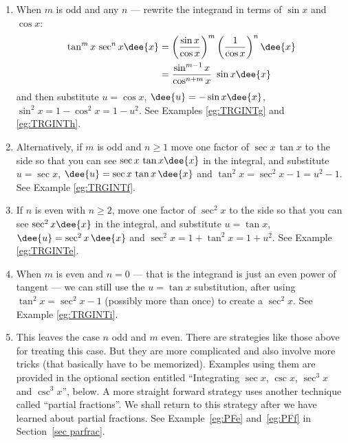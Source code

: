 \begin{enumerate}[(1)]
 \item When $m$ is odd and any $n$ --- rewrite the integrand in terms of $\sin
x$ and $\cos x$:
\begin{align*}
\tan^m x\,\sec^n x\dee{x}
       &=\left(\frac{\sin x}{\cos x}\right)^m 
         \left(\frac{1}{\cos x}\right)^n\dee{x}\\
       &=\frac{\sin^{m-1}x}{\cos^{n+m}x}\ \sin x\dee{x}
\end{align*}
and then substitute $u=\cos x$, $\dee{u} = -\sin x\dee{x}$, $\sin^2x = 1-\cos^2x=1-u^2$. See
Examples \ref{eg:TRGINTg} and \ref{eg:TRGINTh}.
 \item Alternatively, if $m$ is odd and $n \geq 1$ move one factor of
$\sec x\,\tan x$ to the side so that you can see $\sec x\,\tan x\dee{x}$
in the integral, and substitute $u=\sec x$, $\dee{u}=\sec x\,\tan x\,\dee{x}$
and $\tan^2 x = \sec^2 x-1=u^2-1$. See Example \ref{eg:TRGINTf}.

\item
If $n$ is even with $n\ge 2$, move one factor of $\sec^2 x$ to
the side so that you can see $\sec^2 x\dee{x}$ in the integral, and
substitute $u=\tan x$, $\dee{u}=\sec^2 x\,\dee{x}$ and $\sec^2 x = 1+\tan^2 x=1+u^2$.
See Example \ref{eg:TRGINTe}.

\item When $m$ is even and $n=0$ --- that is the integrand is just an even power of
tangent --- we can still use the $u=\tan x$ substitution,
after using $\tan^2x = \sec^2 x - 1$ (possibly more than once) to
create a $\sec^2 x$. See Example \ref{eg:TRGINTi}.

\item This leaves the case $n$ odd and $m$ even.
There are strategies like those above for treating this case. But
they are more complicated and also involve more tricks (that basically
have to be memorized). Examples using
them are provided in the optional section entitled
``Integrating $\sec x$, $\csc x$, $\sec^3 x$ and $\csc^3 x$'', below.
A more straight forward strategy uses another technique
called ``partial fractions''. We shall return to this strategy after we
have learned about partial fractions. See Example~\ref{eg:PFe} and~\ref{eg:PFf} in
Section~\ref{sec parfrac}.
\end{enumerate}

